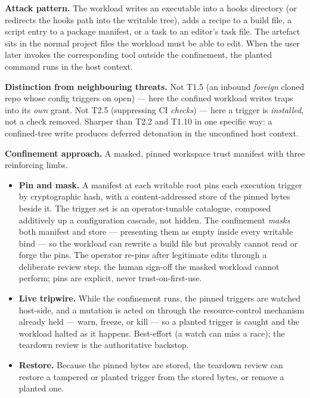 \textbf{Attack pattern.} The workload writes an executable into a hooks
directory (or redirects the hooks path into the writable tree), adds a
recipe to a build file, a script entry to a package manifest, or a task
to an editor's task file. The artefact sits in the normal project files
the workload must be able to edit. When the user later invokes the
corresponding tool outside the confinement, the planted command runs in
the host context.

\textbf{Distinction from neighbouring threats.} Not T1.5 (an inbound
\emph{foreign} cloned repo whose config triggers on open) --- here the
confined workload writes traps into its \emph{own} grant. Not T2.5
(suppressing CI \emph{checks}) --- here a trigger is \emph{installed},
not a check removed. Sharper than T2.2 and T1.10 in one specific way: a
confined-tree write produces deferred detonation in the unconfined host
context.

\textbf{Confinement approach.} A masked, pinned workspace trust manifest
with three reinforcing limbs.

\begin{itemize}
\tightlist
\item
  \textbf{Pin and mask.} A manifest at each writable root pins each
  execution trigger by cryptographic hash, with a content-addressed
  store of the pinned bytes beside it. The trigger set is an
  operator-tunable catalogue, composed additively up a configuration
  cascade, not hidden. The confinement \emph{masks} both manifest and
  store --- presenting them as empty inside every writable bind --- so
  the workload can rewrite a build file but provably cannot read or
  forge the pins. The operator re-pins after legitimate edits through a
  deliberate review step, the human sign-off the masked workload cannot
  perform; pins are explicit, never trust-on-first-use.
\item
  \textbf{Live tripwire.} While the confinement runs, the pinned
  triggers are watched host-side, and a mutation is acted on through the
  resource-control mechanism already held --- warn, freeze, or kill ---
  so a planted trigger is caught and the workload halted as it happens.
  Best-effort (a watch can miss a race); the teardown review is the
  authoritative backstop.
\item
  \textbf{Restore.} Because the pinned bytes are stored, the teardown
  review can restore a tampered or planted trigger from the stored
  bytes, or remove a planted one.
\end{itemize}

